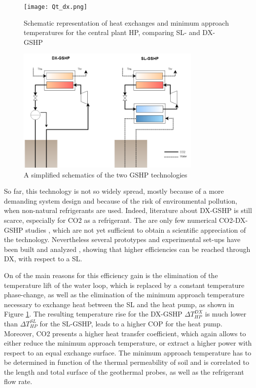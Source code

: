 \documentclass{article}
\begin{document}
\begin{figure}[htp]
	\centering
	\texttt{[image: Qt\_dx.png]}
	\caption{Schematic representation of heat exchanges and minimum approach temperatures for the central plant HP, comparing SL- and DX-GSHP}
	\label{fig:Qt_dx}
\end{figure}


\begin{figure}[htp]
\centering
\includegraphics[width=0.8\textwidth]{GSHP.png}
\caption{A simplified schematics of the two GSHP technologies}
\label{fig:gshp}
\end{figure}

So far, this technology is not so widely spread, mostly because of a more demanding system design and because of the risk of environmental pollution, when non-natural refrigerants are used. Indeed, literature about DX-GSHP is still scarce, especially for CO2 as a refrigerant. The are only few numerical CO2-DX-GSHP studies \cite{eslami-nejadModelingTwophaseCO2filled2014a,ghazizade-ahsaeeEnergyExergyInvestigation2018,austinParametricStudyPerformance2011,eslami-nejadQuasitransientModelTranscritical2015}, which are not yet sufficient to obtain a scientific appreciation of the technology. Nevertheless several prototypes and experimental set-ups have been built and analyzed \cite{eslami-nejadDetailedTheoreticalCharacterization2018, badacheExperimentalStudyCarbon2018, guoTechnoeconomicComparisonDirect2012}, showing that higher efficiencies can be reached through DX, with respect to a SL.

On of the main reasons for this efficiency gain is the elimination of the temperature lift of the water loop, which is replaced by a constant temperature phase-change, as well as the elimination of the minimum approach temperature necessary to exchange heat between the SL and the heat pump, as shown in Figure \ref{fig:Qt_dx}. The resulting temperature rise for the DX-GSHP $\Delta T_{HP}^{DX}$ is much lower than $\Delta T_{HP}^{SL}$ for the SL-GSHP, leads to a higher COP for the heat pump. 
Moreover, CO2 presents a higher heat transfer coefficient, which again allows to either reduce the minimum approach temperature, or extract a higher power with respect to an equal exchange surface. The minimum approach temperature has to be determined in function of the thermal permeability of soil and is correlated to the length and total surface of the geothermal probes, as well as the refrigerant flow rate.
\end{document}
